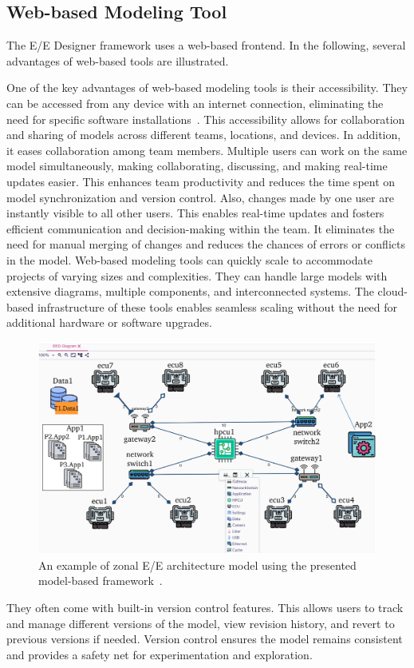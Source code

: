     \subsection{Web-based Modeling Tool}
    
    The E/E Designer framework uses a web-based frontend. In the following, several advantages of web-based tools are illustrated.
    
    One of the key advantages of web-based modeling tools is their accessibility. They can be accessed from any device with an internet connection, eliminating the need for specific software installations~\cite{askaripoor2023designer}. This accessibility allows for collaboration and sharing of models across different teams, locations, and devices. In addition, it eases collaboration among team members. Multiple users can work on the same model simultaneously, making collaborating, discussing, and making real-time updates easier. This enhances team productivity and reduces the time spent on model synchronization and version control. Also, changes made by one user are instantly visible to all other users. This enables real-time updates and fosters efficient communication and decision-making within the team. It eliminates the need for manual merging of changes and reduces the chances of errors or conflicts in the model.
    Web-based modeling tools can quickly scale to accommodate projects of varying sizes and complexities. They can handle large models with extensive diagrams, multiple components, and interconnected systems. The cloud-based infrastructure of these tools enables seamless scaling without the need for additional hardware or software upgrades.
    \begin{figure}[t]
    	\centering
    	\includegraphics[width=1\textwidth]{figures/ee_model1.pdf}
    	\caption{ An example of zonal E/E architecture model using the presented model-based framework~\cite{askaripoor2023designer}.}
    	\label{fig5}
    \end{figure}
    They often come with built-in version control features. This allows users to track and manage different versions of the model, view revision history, and revert to previous versions if needed. Version control ensures the model remains consistent and provides a safety net for experimentation and exploration.
    
